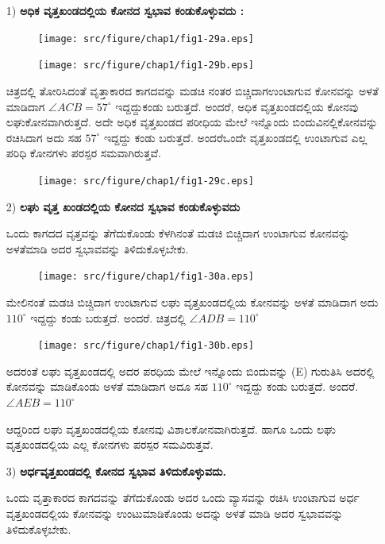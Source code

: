   \eject
    \begin{itemize}
  \item[1)] \textbf{ಅಧಿಕ ವೃತ್ತಖಂಡದಲ್ಲಿಯ ಕೋನದ ಸ್ವಭಾವ ಕಂಡುಕೊಳ್ಳುವದು :}
  \begin{figure}[H]
\centering
\texttt{[image: src/figure/chap1/fig1-29a.eps]}
\end{figure}
\begin{figure}[H]
\centering
\texttt{[image: src/figure/chap1/fig1-29b.eps]}
\end{figure}
 
 ಚಿತ್ರದಲ್ಲಿ ತೋರಿಸಿದಂತೆ ವೃತ್ತಾಕಾರದ ಕಾಗದವನ್ನು ಮಡಚಿ ನಂತರ ಬಿಚ್ಚಿದಾಗ\break ಉಂಟಾಗುವ ಕೋನವನ್ನು ಅಳತೆ ಮಾಡಿದಾಗ $\angle ACB = 57^\circ$ ಇದ್ದದ್ದು\break ಕಂಡು ಬರುತ್ತದೆ. ಅಂದರೆ, ಅಧಿಕ ವೃತ್ತಖಂಡದಲ್ಲಿಯ ಕೋನವು ಲಘುಕೋನವಾಗಿರುತ್ತದೆ. ಅದೇ ಅಧಿಕ ವೃತ್ತಖಂಡದ ಪರೀಧಿಯ ಮೇಲೆ ಇನ್ನೊಂದು ಬಿಂದುವಿನಲ್ಲಿ\break ಕೋನವನ್ನು ರಚಿಸಿದಾಗ ಅದು ಸಹ $57^\circ$ ಇದ್ದದ್ದು ಕಂಡು ಬರುತ್ತದೆ. ಅಂದರೆ\break ಒಂದೇ ವೃತ್ತಖಂಡದಲ್ಲಿ ಉಂಟಾಗುವ ಎಲ್ಲ ಪರಿಧಿ ಕೋನಗಳು ಪರಸ್ಪರ ಸಮ\break ವಾಗಿರುತ್ತವೆ. 
 \begin{figure}[H]
\centering
\texttt{[image: src/figure/chap1/fig1-29c.eps]}
\end{figure}

 \item[2)] \textbf{ಲಘು ವೃತ್ತ ಖಂಡದಲ್ಲಿಯ ಕೋನದ ಸ್ವಭಾವ ಕಂಡುಕೊಳ್ಳುವದು} 
 
 ಒಂದು ಕಾಗದದ ವೃತ್ತವನ್ನು ತೆಗೆದುಕೊಂಡು ಕೆಳಗಿನಂತೆ ಮಡಚಿ ಬಿಚ್ಚಿದಾಗ ಉಂಟಾಗುವ ಕೋನವನ್ನು ಅಳತೆಮಾಡಿ ಅದರ ಸ್ವಭಾವವನ್ನು ತಿಳಿದುಕೊಳ್ಳಬೇಕು. 
 \begin{figure}[H]
\centering
\texttt{[image: src/figure/chap1/fig1-30a.eps]}
\end{figure}
 
 ಮೇಲಿನಂತೆ ಮಡಚಿ ಬಿಚ್ಚಿದಾಗ ಉಂಟಾಗುವ ಲಘು ವೃತ್ತಖಂಡದಲ್ಲಿಯ ಕೋನ\-ವನ್ನು ಅಳತೆ ಮಾಡಿದಾಗ ಅದು $110^\circ$ ಇದ್ದದ್ದು ಕಂಡು ಬರುತ್ತದೆ. ಅಂದರೆ. ಚಿತ್ರದಲ್ಲಿ  $\angle ADB = 110^\circ$
  \begin{figure}[H]
\centering
\texttt{[image: src/figure/chap1/fig1-30b.eps]}
\end{figure}
 
 ಅದರಂತೆ ಲಘು ವೃತ್ತಖಂಡದಲ್ಲಿ ಅದರ ಪರಧಿಯ ಮೇಲೆ ಇನ್ನೊಂದು ಬಿಂದುವನ್ನು (E) ಗುರುತಿಸಿ ಅದರಲ್ಲಿ ಕೋನವನ್ನು ಮಾಡಿಕೊಂಡು ಅಳತೆ ಮಾಡಿದಾಗ ಅದೂ ಸಹ  $110^\circ$ ಇದ್ದದ್ದು ಕಂಡು ಬರುತ್ತದೆ. ಅಂದರೆ.  $\angle AEB = 110^\circ$
 
 ಆದ್ದರಿಂದ ಲಘು ವೃತ್ತಖಂಡದಲ್ಲಿಯ ಕೋನವು ವಿಶಾಲಕೋನವಾಗಿರುತ್ತದೆ. ಹಾಗೂ ಒಂದು ಲಘು ವೃತ್ತಖಂಡದಲ್ಲಿಯ ಎಲ್ಲ ಕೋನಗಳು ಪರಸ್ಪರ ಸಮವಿರುತ್ತವೆ.  
 
  \item[3)] \textbf{ಅರ್ಧವೃತ್ತಖಂಡದಲ್ಲಿ ಕೋನದ ಸ್ವಭಾವ ತಿಳಿದುಕೊಳ್ಳುವದು.}
  
  ಒಂದು ವೃತ್ತಾಕಾರದ ಕಾಗದವನ್ನು  ತೆಗೆದುಕೊಂಡು ಅದರ ಒಂದು ವ್ಯಾಸವನ್ನು ರಚಿಸಿ ಉಂಟಾಗುವ ಅರ್ಧ ವೃತ್ತಖಂಡದಲ್ಲಿಯ ಕೋನವನ್ನು ಉಂಟುಮಾಡಿ\break ಕೊಂಡು ಅದನ್ನು ಅಳತೆ ಮಾಡಿ ಅದರ ಸ್ವಭಾವವನ್ನು ತಿಳಿದುಕೊಳ್ಳಬೇಕು. 
 

\end{itemize}
